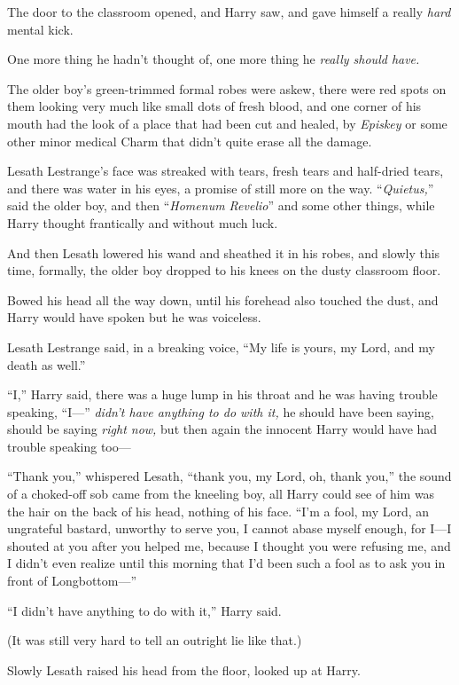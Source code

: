 The door to the classroom opened, and Harry saw, and gave himself a really \emph{hard} mental kick.

One more thing he hadn’t thought of, one more thing he \emph{really should have.}

The older boy’s green-trimmed formal robes were askew, there were red spots on them looking very much like small dots of fresh blood, and one corner of his mouth had the look of a place that had been cut and healed, by \emph{Episkey} or some other minor medical Charm that didn’t quite erase all the damage.

Lesath Lestrange’s face was streaked with tears, fresh tears and half-dried tears, and there was water in his eyes, a promise of still more on the way. “\emph{Quietus,}” said the older boy, and then “\emph{Homenum Revelio}” and some other things, while Harry thought frantically and without much luck.

And then Lesath lowered his wand and sheathed it in his robes, and slowly this time, formally, the older boy dropped to his knees on the dusty classroom floor.

Bowed his head all the way down, until his forehead also touched the dust, and Harry would have spoken but he was voiceless.

Lesath Lestrange said, in a breaking voice, “My life is yours, my Lord, and my death as well.”

“I,” Harry said, there was a huge lump in his throat and he was having trouble speaking, “I—” \emph{didn’t have anything to do with it,} he should have been saying, should be saying \emph{right now,} but then again the innocent Harry would have had trouble speaking too—

“Thank you,” whispered Lesath, “thank you, my Lord, oh, thank you,” the sound of a choked-off sob came from the kneeling boy, all Harry could see of him was the hair on the back of his head, nothing of his face. “I’m a fool, my Lord, an ungrateful bastard, unworthy to serve you, I cannot abase myself enough, for I—I shouted at you after you helped me, because I thought you were refusing me, and I didn’t even realize until this morning that I’d been such a fool as to ask you in front of Longbottom—”

“I didn’t have anything to do with it,” Harry said.

(It was still very hard to tell an outright lie like that.)

Slowly Lesath raised his head from the floor, looked up at Harry.


